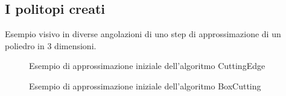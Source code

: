 \subsection*{I politopi creati}

Esempio visivo in diverse angolazioni di uno step di approssimazione di un poliedro 
in 3 dimensioni.

\begin{figure}[H]
    \centering
    
    
    \caption{Esempio di approssimazione iniziale dell'algoritmo CuttingEdge}
\end{figure}

\begin{figure}[H]
    \centering
    
    
    \caption{Esempio di approssimazione iniziale dell'algoritmo BoxCutting}
\end{figure}